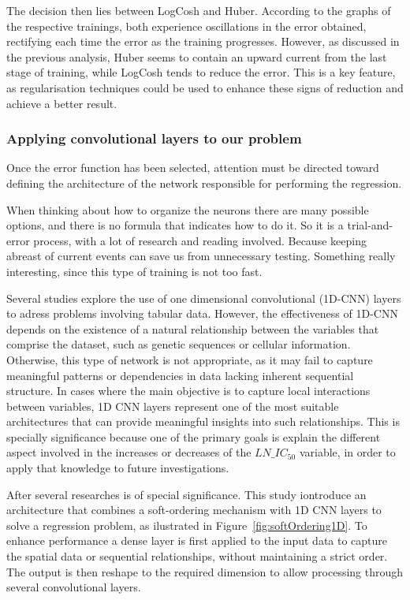 The decision then lies between LogCosh and Huber. According to the graphs of the respective trainings, both experience oscillations in the error obtained, rectifying each time the error as the training progresses. However, as discussed in the previous analysis, Huber seems to contain an upward current from the last stage of training, while LogCosh tends to reduce the error. This is a key feature, as regularisation techniques could be used to enhance these signs of reduction and achieve a better result.

\subsubsection{Applying convolutional layers to our problem}

Once the error function has been selected, attention must be directed toward defining the architecture of the network responsible for performing the regression.

When thinking about how to organize the neurons there are many possible options, and there is no formula that indicates how to do it. So it is a trial-and-error process, with a lot of research and reading involved. Because keeping abreast of current events can save us from unnecessary testing. Something really interesting, since this type of training is not too fast.

Several studies \cite{arik2020tabnetattentiveinterpretabletabular, convolutionalToSkipImpute, tabularIntoImages} explore the use of one dimensional convolutional (1D-CNN) layers to adress problems involving tabular data. However, the effectiveness of 1D-CNN depends on the existence of a natural relationship between the variables that comprise the dataset, such as genetic sequences or cellular information. Otherwise, this type of network is not appropriate, as it may fail to capture meaningful patterns or dependencies in data lacking inherent sequential structure. In cases where the main objective is to capture local interactions between variables, 1D CNN layers represent one of the most suitable architectures that can provide meaningful insights into such relationships. This is specially significance because one of the primary goals is explain the different aspect involved in the increases or decreases of the \(LN\_IC_{50}\) variable, in order to apply that knowledge to future investigations.

After several researches \cite{softOrdering1D} is of special significance. This study iontroduce an architecture that combines a soft-ordering mechanism with 1D CNN layers to solve a regression problem, as ilustrated in Figure~\ref{fig:softOrdering1D}. To enhance performance a dense layer is first applied to the  input data to capture the spatial data or sequential relationships, without maintaining a strict order. The output is then reshape to the required dimension to allow processing through several convolutional layers. 

